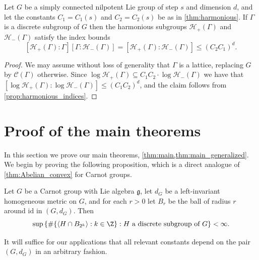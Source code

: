 \begin{corollary}
\label{cor:harmonious_bounded_index}
Let $G$ be a simply connected nilpotent Lie group of step $s$ and dimension $d$, and let the constants $C_1=C_1(s)$ and $C_2=C_2(s)$ be as in \cref{thm:harmonious}. If $\Gamma$ is a discrete subgroup of $G$ then the harmonious subgroups $\mathscr{H}_+(\Gamma)$ and $\mathscr{H}_-(\Gamma)$ satisfy the index bounds
\[
[\mathscr{H}_+(\Gamma):\Gamma][\Gamma:\mathscr{H}_-(\Gamma)]= [\mathscr{H}_+(\Gamma):\mathscr{H}_-(\Gamma)] \leq (C_2C_1)^d.
\]
%
\end{corollary}

\begin{proof} 
We may assume without loss of generality that $\Gamma$ is a lattice, replacing $G$ by $\mathscr{C}(\Gamma)$  otherwise. Since $\log \mathscr{H}_+(\Gamma) \subseteq C_1C_2 \cdot \log \mathscr{H}_-(\Gamma)$ we have that $[\log \mathscr{H}_+(\Gamma):\log \mathscr{H}_-(\Gamma)]\leq (C_1C_2)^d$, and the claim follows from \cref{prop:harmonious_indices}.
\end{proof}

\section{Proof of the main theorems}
\label{sec:wrap_up}

In this section we prove our main theorems, \cref{thm:main,thm:main_generalized}. We begin by proving the following proposition, which is a direct analogue of \cref{thm:Abelian_convex} for Carnot groups. 
%


%



%
%
%
%
%
%
%
%
%



\begin{proposition}
\label{prop:exploring_Carnot_subgroup}
Let $G$ be a Carnot group with Lie algebra $\mathfrak{g}$, let $d_G$ be a left-invariant homogeneous metric on $G$, and for each $r>0$ let $B_r$ be the ball of radius $r$ around $\mathrm{id}$ in $(G,d_G)$. Then
\[
\sup\left\{\#\{\langle H \cap B_{2^k} \rangle : k \in \Z\} : H \text{ a discrete subgroup of $G$}\right\} <\infty.
\]
\end{proposition}

It will suffice for our applications that all relevant constants depend on the pair $(G,d_G)$ in an arbitrary fashion. %


